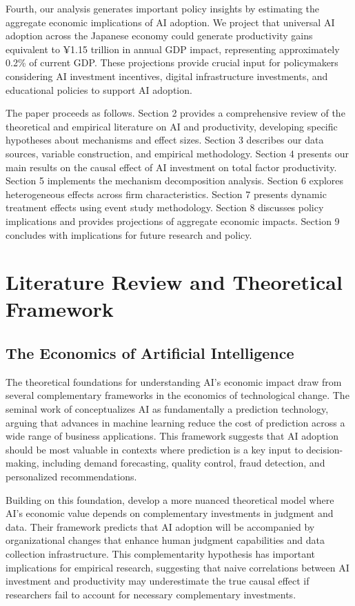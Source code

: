 \documentclass[12pt, a4paper]{article}
\begin{document}
Fourth, our analysis generates important policy insights by estimating the aggregate economic implications of AI adoption. We project that universal AI adoption across the Japanese economy could generate productivity gains equivalent to ¥1.15 trillion in annual GDP impact, representing approximately 0.2\% of current GDP. These projections provide crucial input for policymakers considering AI investment incentives, digital infrastructure investments, and educational policies to support AI adoption.

The paper proceeds as follows. Section 2 provides a comprehensive review of the theoretical and empirical literature on AI and productivity, developing specific hypotheses about mechanisms and effect sizes. Section 3 describes our data sources, variable construction, and empirical methodology. Section 4 presents our main results on the causal effect of AI investment on total factor productivity. Section 5 implements the mechanism decomposition analysis. Section 6 explores heterogeneous effects across firm characteristics. Section 7 presents dynamic treatment effects using event study methodology. Section 8 discusses policy implications and provides projections of aggregate economic impacts. Section 9 concludes with implications for future research and policy.

\section{Literature Review and Theoretical Framework}

\subsection{The Economics of Artificial Intelligence}

The theoretical foundations for understanding AI's economic impact draw from several complementary frameworks in the economics of technological change. The seminal work of \citet{brynjolfsson2019artificial} conceptualizes AI as fundamentally a prediction technology, arguing that advances in machine learning reduce the cost of prediction across a wide range of business applications. This framework suggests that AI adoption should be most valuable in contexts where prediction is a key input to decision-making, including demand forecasting, quality control, fraud detection, and personalized recommendations.

Building on this foundation, \citet{agrawal2018prediction} develop a more nuanced theoretical model where AI's economic value depends on complementary investments in judgment and data. Their framework predicts that AI adoption will be accompanied by organizational changes that enhance human judgment capabilities and data collection infrastructure. This complementarity hypothesis has important implications for empirical research, suggesting that naive correlations between AI investment and productivity may underestimate the true causal effect if researchers fail to account for necessary complementary investments.
\end{document}
